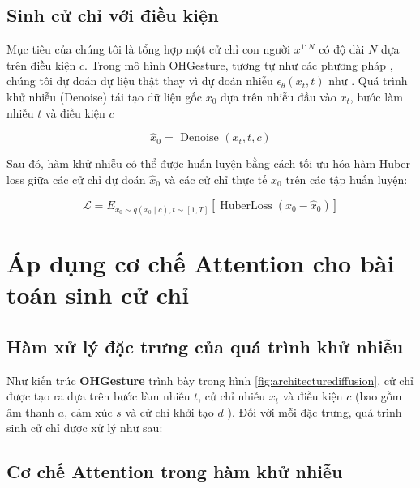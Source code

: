 \subsection{Sinh cử chỉ với điều kiện}

Mục tiêu của chúng tôi là tổng hợp một cử chỉ con người $x^{1: N}$ có độ dài $N$ dựa trên điều kiện $c$. Trong mô hình OHGesture, tương tự như các phương pháp \cite{ramesh2022hierarchical} \cite{tevet2022human}, chúng tôi dự đoán dự liệu thật thay vì dự đoán nhiễu $\epsilon_{\theta}\left(x_{t}, t\right)$ như \cite{ho2020denoising}. Quá trình khử nhiễu (Denoise) tái tạo dữ liệu gốc $x_{0}$ dựa trên nhiễu đầu vào $x_{t}$, bước làm nhiễu $t$ và điều kiện $c$

\begin{equation} \label{eq:condition}
\hat{x}_{0}=\text { Denoise }\left(x_{t}, t, c\right)
\end{equation}

Sau đó, hàm khử nhiễu có thể được huấn luyện bằng cách tối ưu hóa hàm Huber loss \cite{huber1992robust} giữa các cử chỉ dự đoán $\hat{x}_{0}$ và các cử chỉ thực tế $x_{0}$ trên các tập huấn luyện:

\begin{equation} \label{eq:huberloss}
\mathcal{L}=E_{x_{0} \sim q\left(x_{0} \mid c\right), t \sim[1, T]}\left[\operatorname{HuberLoss}\left(x_{0}-\hat{x}_{0}\right)\right]
\end{equation}

\section{Áp dụng cơ chế Attention cho bài toán sinh cử chỉ}

\subsection{Hàm xử lý đặc trưng của quá trình khử nhiễu}

Như kiến trúc \textbf{OHGesture} trình bày trong hình \autoref{fig:architecturediffusion}, cử chỉ được tạo ra dựa trên bước làm nhiễu $t$, cử chỉ nhiễu $x_{t}$ và điều kiện $c$ (bao gồm âm thanh $a$, cảm xúc $s$ và cử chỉ khởi tạo $d$ ). Đối với mỗi đặc trưng, quá trình sinh cử chỉ được xử lý như sau:


\subsection{Cơ chế Attention trong hàm khử nhiễu}


